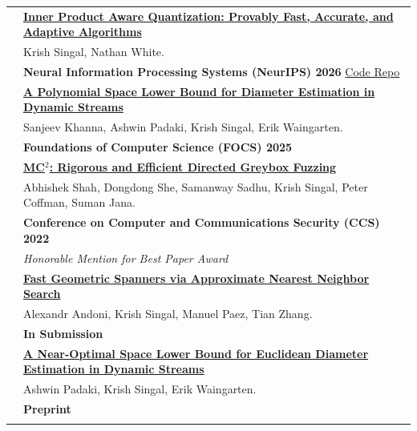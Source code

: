 \documentclass[10pt]{article}
\newlength{\lcol}\setlength{\lcol}{100pt}
\newlength{\rcol}\setlength{\rcol}{\dimexpr\textwidth-\lcol\relax}
\newcommand{\bluebf}[1]{{\color{customlinkcolor}\textbf{#1}}}
\begin{document}
\begin{longtable}{@{}p{\lcol}@{}p{\rcol}@{}}
& \bluebf{\href{https://arxiv.org/abs/2606.00289}{Inner Product Aware Quantization: Provably Fast, Accurate, and Adaptive Algorithms}} \\
& Krish Singal, Nathan White.\\
& \textbf{Neural Information Processing Systems (NeurIPS) 2026} \quad \href{https://github.com/nathanllww/Inner-Product-Aware-Quantization}{Code Repo} \\[6pt]

& \bluebf{\href{https://arxiv.org/abs/2510.04918}{A Polynomial Space Lower Bound for Diameter Estimation in Dynamic Streams}}\\
& Sanjeev Khanna, Ashwin Padaki, Krish Singal, Erik Waingarten.\\
& \textbf{Foundations of Computer Science (FOCS) 2025} \\[6pt]

& \bluebf{\href{https://arxiv.org/abs/2208.14530}{MC$^2$: Rigorous and Efficient Directed Greybox Fuzzing}}\\
& Abhishek Shah, Dongdong She, Samanway Sadhu, Krish Singal,
  Peter Coffman, Suman Jana.\\
  
& \textbf{Conference on Computer and Communications Security (CCS) 2022} \\
&\textit{Honorable Mention for Best Paper Award} \\

& \bluebf{\href{https://arxiv.org/abs/2609.26934}{Fast Geometric Spanners via Approximate Nearest Neighbor Search}} \\
& Alexandr Andoni, Krish Singal, Manuel Paez, Tian Zhang.\\
& \textbf{In Submission} \\[6pt]

& \bluebf{\href{https://arxiv.org/abs/2609.19089}{A Near-Optimal Space Lower Bound for Euclidean Diameter Estimation in Dynamic Streams}} \\
& Ashwin Padaki, Krish Singal, Erik Waingarten.\\
& \textbf{Preprint} \\[6pt]

\\[5pt]



\end{longtable}
\end{document}

